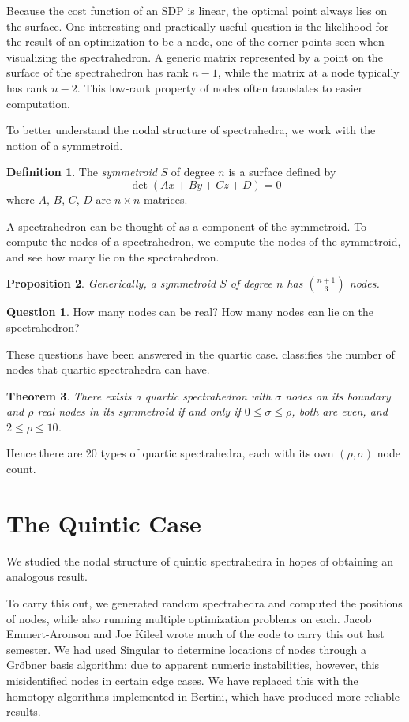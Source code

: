 \documentclass[12pt]{amsart}
\theoremstyle{plain}
\newtheorem{theorem}{Theorem}
\newtheorem{proposition}[theorem]{Proposition}
\theoremstyle{definition}
\newtheorem{definition}[theorem]{Definition}
\newtheorem*{question}{Question}
\begin{document}
Because the cost function of an SDP is linear, the optimal point
always lies on the surface.  One interesting and practically useful
question is the likelihood for the result of an optimization to be a
node, one of the corner points seen when visualizing the
spectrahedron.  A generic matrix represented by a point on the surface
of the spectrahedron has rank $n-1$, while the matrix at a node
typically has rank $n-2$.  This low-rank property of nodes often
translates to easier computation.

To better understand the nodal structure of spectrahedra, we work with the
notion of a symmetroid.
\begin{definition} 
	The \emph{symmetroid} $S$ of degree $n$ is a surface defined by 
	\[ 
		\det (Ax + By + Cz + D) = 0
	\] 
	where $A$, $B$, $C$, $D$ are $n\times n$ matrices.
\end{definition} 
A spectrahedron can be thought of as a component of the symmetroid.
To compute the nodes of a spectrahedron, we compute the nodes of the
symmetroid, and see how many lie on the spectrahedron.

\begin{proposition} 
	Generically, a symmetroid $S$ of degree $n$ has $\binom{n+1}3$ nodes.
\end{proposition} 

\begin{question} 
How many nodes can be real? How many nodes can lie on the spectrahedron?
\end{question} 

These questions have been answered in the quartic case. 
\cite{OKSV} classifies the number of nodes that quartic spectrahedra can have. 
\begin{theorem}\label{quartic}
	There exists a quartic spectrahedron with $\sigma$ nodes on its boundary and
	$\rho$ real nodes in its symmetroid if and only if $0 \le \sigma \le \rho$,
	both are even, and $2 \le \rho \le 10$.
\end{theorem} 
Hence there are 20 types of quartic spectrahedra, each with its own
$(\rho, \sigma)$ node count. 

\section{The Quintic Case}

We studied the nodal structure of quintic spectrahedra in hopes of obtaining an
analogous result.

To carry this out, we generated random spectrahedra and computed
the positions of nodes, while also running multiple optimization
problems on each.  Jacob Emmert-Aronson and Joe Kileel wrote much of
the code to carry this out last semester.  
We had used Singular
to determine locations of nodes through a Gr\"obner basis algorithm;
due to apparent numeric instabilities, however, this misidentified
nodes in certain edge cases.  We have replaced this with the
homotopy algorithms implemented in Bertini, which have produced more
reliable results.  
\end{document}
